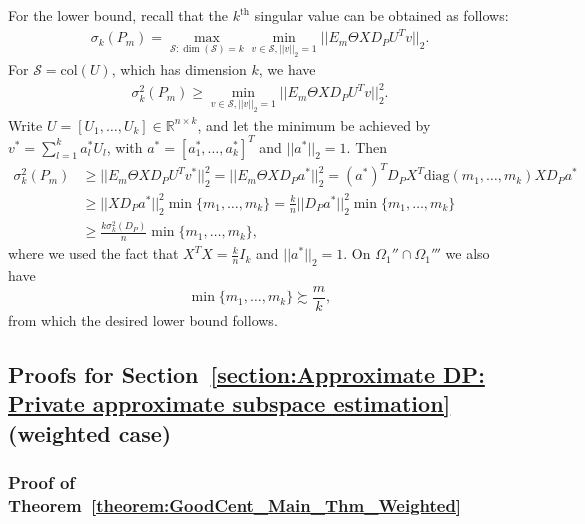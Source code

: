 \documentclass{article}
\begin{document}
For the lower bound, recall that the $k^{\text{th}}$ singular value can be obtained as follows:
\begin{align*}
\sigma_k(P_m) = \mathop{\max}\limits_{\mathcal{S}: \dim(\mathcal{S}) = k}\mathop{\min}\limits_{v \in \mathcal{S}, ||v||_2 = 1}||E_m\Theta XD_PU^Tv||_2.
\end{align*}
For $\mathcal{S} = \text{col}(U)$, which has dimension $k$, we have
\begin{align*}
\sigma^2_k(P_m) \geq \mathop{\min}\limits_{v \in \mathcal{S}, ||v||_2 = 1}||E_m\Theta XD_PU^Tv||_2^2.
\end{align*}
Write $U = [U_1, \dots, U_k] \in \mathbb{R}^{n \times k}$, and let the minimum be achieved by $v^* = \sum_{l = 1}^ka_l^*U_l$, with $a^* = [a_1^*, \dots, a_k^*]^T$ and $||a^*||_2 = 1$. Then
\begin{align*}
\sigma_{k}^2 (P_m) &\geq ||E_m\Theta XD_PU^Tv^*||_2^2 = ||E_m\Theta XD_Pa^*||_2^2 = (a^*)^TD_PX^T\mathrm{diag}(m_1, \dots, m_k)XD_Pa^*\\
&\geq ||XD_Pa^*||_2^2\min\{m_1, \dots, m_k\} = \frac{k}{n}||D_Pa^*||_2^2\min\{m_1, \dots, m_k\}\\
&\geq \frac{k\sigma^2_{k}(D_P)}{n}\min\{m_1, \dots, m_k\},
\end{align*}
where we used the fact that $X^TX = \frac{k}{n}I_k$ and $||a^*||_2 = 1$. On $\Omega_1'' \cap \Omega_1'''$ we also have 
\begin{equation*}
\min\{m_1, \dots, m_k\} \succsim \frac{m}{k},
\end{equation*}
from which the desired lower bound follows.


\subsection{Proofs for Section~\ref{section:Approximate DP: Private approximate subspace estimation} (weighted case)}

\subsubsection{Proof of Theorem~\ref{theorem:GoodCent_Main_Thm_Weighted}}
\label{AppGoodCWt}
\end{document}

